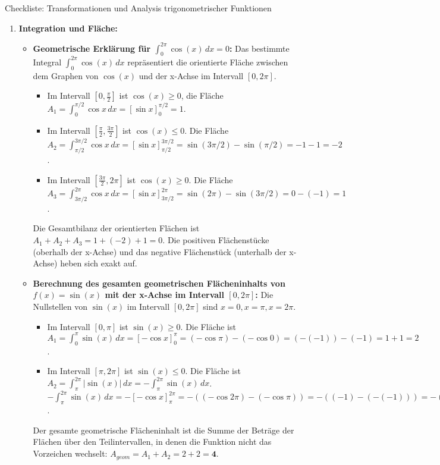 \begin{loesungsumgebung}{Checkliste: Transformationen und Analysis trigonometrischer Funktionen}
\begin{enumerate}[label=(\alph*)]
    \item \textbf{Integration und Fläche:}
    \begin{itemize}
        \item \textbf{Geometrische Erklärung für $\int_0^{2\pi} \cos(x) \,dx = 0$:}
        Das bestimmte Integral $\int_0^{2\pi} \cos(x) \,dx$ repräsentiert die orientierte Fläche zwischen dem Graphen von $\cos(x)$ und der x-Achse im Intervall $[0, 2\pi]$.
        \begin{itemize}
            \item Im Intervall $[0, \frac{\pi}{2}]$ ist $\cos(x) \ge 0$, die Fläche $A_1 = \int_0^{\pi/2} \cos x \,dx = [\sin x]_0^{\pi/2} = 1$.
            \item Im Intervall $[\frac{\pi}{2}, \frac{3\pi}{2}]$ ist $\cos(x) \le 0$. Die Fläche $A_2 = \int_{\pi/2}^{3\pi/2} \cos x \,dx = [\sin x]_{\pi/2}^{3\pi/2} = \sin(3\pi/2) - \sin(\pi/2) = -1 - 1 = -2$.
            \item Im Intervall $[\frac{3\pi}{2}, 2\pi]$ ist $\cos(x) \ge 0$. Die Fläche $A_3 = \int_{3\pi/2}^{2\pi} \cos x \,dx = [\sin x]_{3\pi/2}^{2\pi} = \sin(2\pi) - \sin(3\pi/2) = 0 - (-1) = 1$.
        \end{itemize}
        Die Gesamtbilanz der orientierten Flächen ist $A_1 + A_2 + A_3 = 1 + (-2) + 1 = 0$.
        Die positiven Flächenstücke (oberhalb der x-Achse) und das negative Flächenstück (unterhalb der x-Achse) heben sich exakt auf.

        \item \textbf{Berechnung des gesamten geometrischen Flächeninhalts von $f(x)=\sin(x)$ mit der x-Achse im Intervall $[0, 2\pi]$:}
        Die Nullstellen von $\sin(x)$ im Intervall $[0, 2\pi]$ sind $x=0, x=\pi, x=2\pi$.
        \begin{itemize}
            \item Im Intervall $[0, \pi]$ ist $\sin(x) \ge 0$. Die Fläche ist $A_1 = \int_0^\pi \sin(x) \,dx = [-\cos x]_0^\pi = (-\cos\pi) - (-\cos 0) = (-(-1)) - (-1) = 1+1=2$.
            \item Im Intervall $[\pi, 2\pi]$ ist $\sin(x) \le 0$. Die Fläche ist $A_2 = \int_\pi^{2\pi} |\sin(x)| \,dx = -\int_\pi^{2\pi} \sin(x) \,dx$.
            $-\int_\pi^{2\pi} \sin(x) \,dx = -[-\cos x]_\pi^{2\pi} = -((-\cos 2\pi) - (-\cos \pi)) = -((-1) - (-(-1))) = -(-1-1) = -(-2) = 2$.
        \end{itemize}
        Der gesamte geometrische Flächeninhalt ist die Summe der Beträge der Flächen über den Teilintervallen, in denen die Funktion nicht das Vorzeichen wechselt: $A_{geom} = A_1 + A_2 = 2+2 = \mathbf{4}$.
    \end{itemize}


\end{enumerate}
\end{loesungsumgebung}
